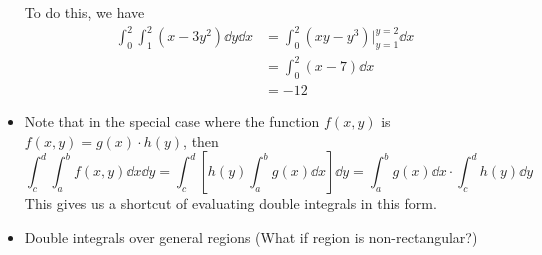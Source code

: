 \begin{itemize}
\begin{example}
\begin{equation}
              \end{equation}
              To do this, we have
              \begin{align}
                  \int_0^2 \int_1^2 (x-3y^2)\dd{y}\dd{x} & = \int_0^2 (xy-y^3)\big\rvert_{y=1}^{y=2}\dd{x} \\
                                                         & = \int_0^2 (x-7)\dd{x}                          \\
                                                         & = -12
              \end{align}
          \end{example}
    \item Note that in the special case where the function $f(x,y)$ is $f(x,y)=g(x) \cdot h(y)$, then
          \begin{equation}
              \int_c^d \int_a^b f(x,y)\dd{x}\dd{y} = \int_c^d\left[h(y)\int_a^b g(x) \dd{x}\right] \dd{y} = \int_a^b g(x) \dd{x} \cdot \int_c^d h(y) \dd{y}
          \end{equation}
          This gives us a shortcut of evaluating double integrals in this form.
    \item Double integrals over general regions (What if region is non-rectangular?)


\end{itemize}
